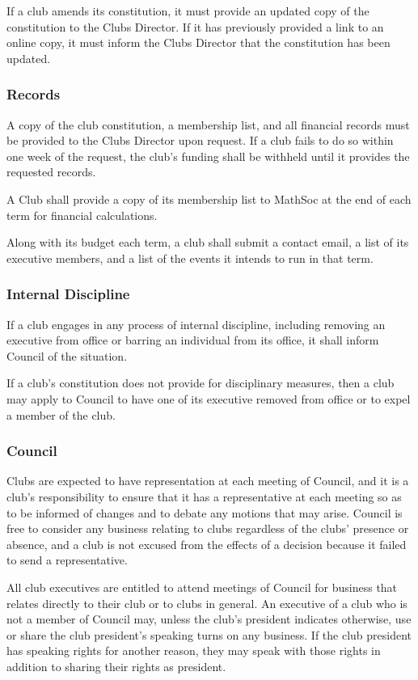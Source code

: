 If a club amends its constitution, it must provide an updated copy of the
constitution to the Clubs Director. If it has previously provided a link to an
online copy, it must inform the Clubs Director that the constitution has been
updated.

\subsubsection{Records}
A copy of the club constitution, a membership list, and all financial records
must be provided to the Clubs Director upon request. If a club fails to do so
within one week of the request, the club's funding shall be withheld until it
provides the requested records.

A Club shall provide a copy of its membership list to MathSoc at the end of each
term for financial calculations.

Along with its budget each term, a club shall submit a contact email, a list of
its executive members, and a list of the events it intends to run in that term.

\subsubsection{Internal Discipline}
If a club engages in any process of internal discipline, including removing an
executive from office or barring an individual from its office, it shall inform
Council of the situation.

If a club's constitution does not provide for disciplinary measures, then a club
may apply to Council to have one of its executive removed from office or to
expel a member of the club.

\subsubsection{Council}
Clubs are expected to have representation at each meeting of Council, and it is
a club's responsibility to ensure that it has a representative at each meeting
so as to be informed of changes and to debate any motions that may arise.
Council is free to consider any business relating to clubs regardless of the
clubs' presence or absence, and a club is not excused from the effects of a
decision because it failed to send a representative.

All club executives are entitled to attend meetings of Council for business that
relates directly to their club or to clubs in general. An executive of a club
who is not a member of Council may, unless the club's president indicates
otherwise, use or share the club president's speaking turns on any business. If
the club president has speaking rights for another reason, they may speak with
those rights in addition to sharing their rights as president.

